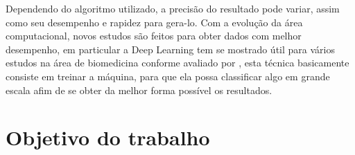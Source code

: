 \documentclass[tcc, capa]{texucpel}
\begin{document}
Dependendo do algoritmo utilizado, a precisão do resultado pode variar, assim como seu desempenho e rapidez para gera-lo.
Com a evolução da área computacional, novos estudos são feitos para obter dados com melhor desempenho, em particular a Deep Learning tem se mostrado útil para vários estudos na área de biomedicina conforme avaliado por \cite{korotcov2017comparison,mamoshina2016applications}
, esta técnica basicamente consiste em treinar a máquina, para que ela possa classificar algo em grande escala afim de se obter da melhor forma possível  os resultados.


\section{Objetivo do trabalho}

\end{document}
